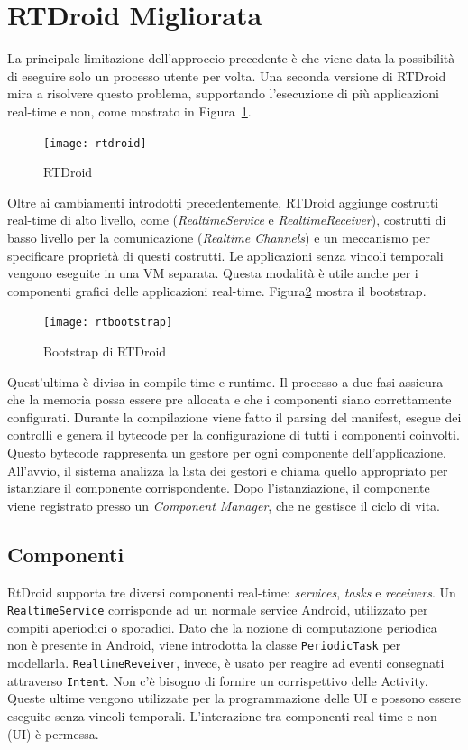 \section{RTDroid Migliorata}
La principale limitazione dell'approccio precedente è che viene data la possibilità di eseguire solo un processo utente per volta. Una seconda versione di RTDroid mira a risolvere questo problema, supportando l'esecuzione di più applicazioni real-time e non, come mostrato in Figura~\ref{fig:rtdroid}.

\begin{figure}[h]
	\centering
	\texttt{[image: rtdroid]}
	\caption{RTDroid}
	\label{fig:rtdroid}
\end{figure}

Oltre ai cambiamenti introdotti precedentemente, RTDroid aggiunge costrutti real-time di alto livello, come (\textit{RealtimeService} e \textit{RealtimeReceiver}), costrutti di basso livello per la comunicazione (\textit{Realtime Channels}) e un meccanismo per specificare proprietà di questi costrutti. Le applicazioni senza vincoli temporali vengono eseguite in una VM separata. Questa modalità è utile anche per i componenti grafici delle applicazioni real-time. Figura\ref{fig:rtbootstrap} mostra il bootstrap.
\begin{figure}[h]
	\centering
	\texttt{[image: rtbootstrap]}
	\caption{Bootstrap di RTDroid}
	\label{fig:rtbootstrap}
\end{figure}

Quest'ultima è divisa in compile time e runtime. Il processo a due fasi assicura che la memoria possa essere pre allocata e che i componenti siano correttamente configurati. Durante la compilazione viene fatto il parsing del manifest, esegue dei controlli e genera il bytecode per la configurazione di tutti i componenti coinvolti. Questo bytecode rappresenta un gestore per ogni componente dell'applicazione. All'avvio, il sistema analizza la lista dei gestori e chiama quello appropriato per istanziare il componente corrispondente. Dopo l'istanziazione, il componente viene registrato presso un \textit{Component Manager}, che ne gestisce il ciclo di vita.

\subsection{Componenti}
RtDroid supporta tre diversi componenti real-time: \textit{services}, \textit{tasks} e \textit{receivers}. Un \texttt{RealtimeService} corrisponde ad un normale service Android, utilizzato per compiti aperiodici o sporadici. Dato che la nozione di computazione periodica non è presente in Android, viene introdotta la classe \texttt{PeriodicTask} per modellarla. \texttt{RealtimeReveiver}, invece, è usato per reagire ad eventi consegnati attraverso \texttt{Intent}. Non c'è bisogno di fornire un corrispettivo delle Activity. Queste ultime vengono utilizzate per la programmazione delle UI e possono essere eseguite senza vincoli temporali. L'interazione tra componenti real-time e non (UI) è permessa.


